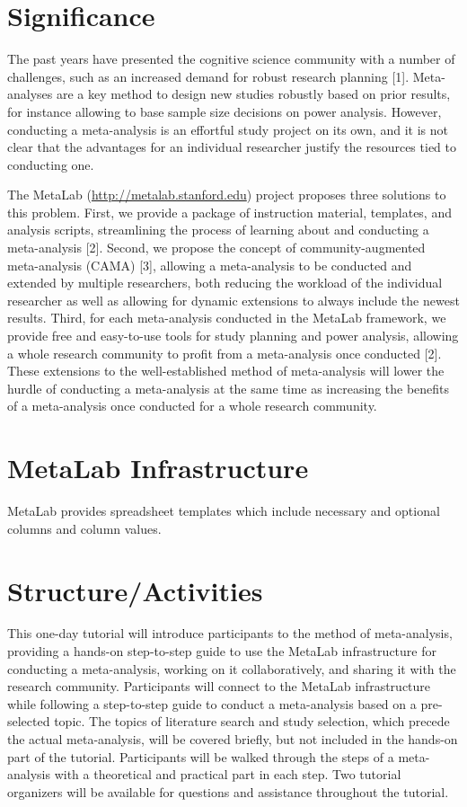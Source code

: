 \documentclass[10pt,letterpaper]{article}
\begin{document}
\section{Significance}

The past years have presented the cognitive science community with a number of challenges, such as an increased demand for robust research planning [1]. Meta-analyses are a key method to design new studies robustly based on prior results, for instance allowing to base sample size decisions on power analysis. However, conducting a meta-analysis is an effortful study project on its own, and it is not clear that the advantages for an individual researcher justify the resources tied to conducting one.

The MetaLab (\url{http://metalab.stanford.edu}) project proposes three solutions to this problem. First, we provide a package of instruction material, templates, and analysis scripts, streamlining the process of learning about and conducting a meta-analysis [2]. Second, we propose the concept of community-augmented meta-analysis (CAMA) [3], allowing a meta-analysis to be conducted and extended by multiple researchers, both reducing the workload of the individual researcher as well as allowing for dynamic extensions to always include the newest results. Third, for each meta-analysis conducted in the MetaLab framework, we provide free and easy-to-use tools for study planning and power analysis, allowing a whole research community to profit from a meta-analysis once conducted [2]. These extensions to the well-established method of meta-analysis will lower the hurdle of conducting a meta-analysis at the same time as increasing the benefits of a meta-analysis once conducted for a whole research community.

\section{MetaLab Infrastructure}

MetaLab provides spreadsheet templates which include necessary and optional columns and column values.

\section{Structure/Activities}

This one-day tutorial will introduce participants to the method of meta-analysis, providing a hands-on step-to-step guide to use the MetaLab infrastructure for conducting a meta-analysis, working on it collaboratively, and sharing it with the research community.
Participants will connect to the MetaLab infrastructure while following a step-to-step guide to conduct a meta-analysis based on a pre-selected topic. The topics of literature search and study selection, which precede the actual meta-analysis, will be covered briefly, but not included in the hands-on part of the tutorial. Participants will be walked through the steps of a meta-analysis with a theoretical and practical part in each step. Two tutorial organizers will be available for questions and assistance throughout the tutorial.
\end{document}
